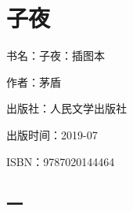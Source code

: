 


\section{子夜}

\par 书名：子夜：插图本
\par 作者：茅盾
\par 出版社：人民文学出版社
\par 出版时间：2019-07
\par ISBN：9787020144464










\subsection*{一}

